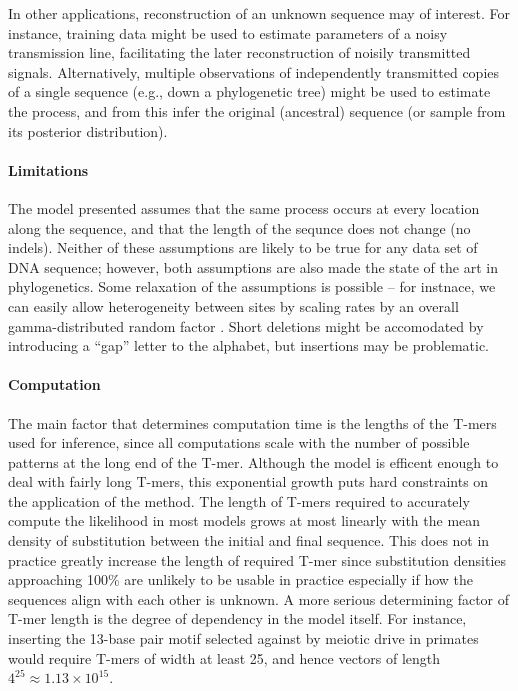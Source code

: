 \documentclass{article}
\theoremstyle{plain}
\theoremstyle{definition}
\begin{document}
In other applications, reconstruction of an unknown sequence may of interest.
For instance, training data might be used to estimate parameters of a noisy transmission line,
facilitating the later reconstruction of noisily transmitted signals.
Alternatively, multiple observations of independently transmitted copies of a single sequence
(e.g., down a phylogenetic tree)
might be used to estimate the process, and from this infer the original (ancestral) sequence
(or sample from its posterior distribution).

\paragraph{Limitations}
The model presented assumes that the same process occurs at every location along the sequence,
and that the length of the sequnce does not change (no indels).
Neither of these assumptions are likely to be true for any data set of DNA sequence;
however, both assumptions are also made the state of the art in phylogenetics.
Some relaxation of the assumptions is possible -- for instnace,
we can easily allow heterogeneity between sites by scaling rates by an overall gamma-distributed random factor \citep{yang1994maximum}.
Short deletions might be accomodated by introducing a ``gap'' letter to the alphabet,
but insertions may be problematic.


\paragraph{Computation}
The main factor that determines computation time
is the lengths of the T-mers used for inference,
since all computations scale with the number of possible patterns at the long end of the T-mer.
Although the model is efficent enough to deal with fairly long T-mers,
this exponential growth puts hard constraints on the application of the method.
The length of T-mers required to accurately compute the likelihood in most models grows at most linearly
with the mean density of substitution between the initial and final sequence.
This does not in practice greatly increase the length of required T-mer
since substitution densities approaching 100\% are unlikely to be usable in practice
especially if how the sequences align with each other is unknown.
A more serious determining factor of T-mer length is the degree of dependency in the model itself.
For instance, inserting the 13-base pair motif selected against by meiotic drive in primates \citep{myers2010drive}
would require T-mers of width at least 25, and hence vectors of length $4^{25} \approx 1.13 \times 10^{15}$.
\end{document}
